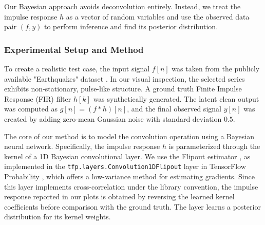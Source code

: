 \documentclass[preprint,1p,times,authoryear]{elsarticle}
\begin{document}
Our Bayesian approach avoids deconvolution entirely. Instead, we treat the impulse response $h$ as a vector of random variables and use the observed data pair $(f, y)$ to perform inference and find its posterior distribution.

\subsubsection{Experimental Setup and Method}

To create a realistic test case, the input signal $f[n]$ was taken from the publicly available "Earthquakes" dataset \citep{EarthquakesUCR2018}. In our visual inspection, the selected series exhibits non-stationary, pulse-like structure. A ground truth Finite Impulse Response (FIR) filter $h[k]$ was synthetically generated. The latent clean output was computed as $g[n] = (f * h)[n]$, and the final observed signal $y[n]$ was created by adding zero-mean Gaussian noise with standard deviation $0.5$.

The core of our method is to model the convolution operation using a Bayesian neural network. Specifically, the impulse response $h$ is parameterized through the kernel of a 1D Bayesian convolutional layer. We use the Flipout estimator \citep{Wen2018}, as implemented in the \texttt{tfp.layers.Convolution1DFlipout} layer in TensorFlow Probability \citep{tensorflow2015-whitepaper, Dillon2017TFD, TFPConvolution1DFlipoutDocs}, which offers a low-variance method for estimating gradients. Since this layer implements cross-correlation under the library convention, the impulse response reported in our plots is obtained by reversing the learned kernel coefficients before comparison with the ground truth. The layer learns a posterior distribution for its kernel weights.
\end{document}
